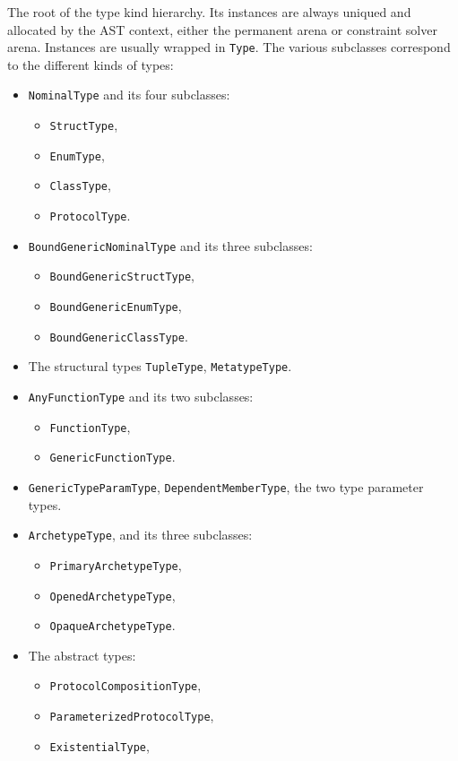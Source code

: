 \documentclass[../generics]{subfiles}
\begin{document}
The root of the type kind hierarchy. Its instances are always uniqued and allocated by the AST context, either the permanent arena or constraint solver arena. Instances are usually wrapped in \texttt{Type}. The various subclasses correspond to the different kinds of types:
\begin{itemize}
\item \texttt{NominalType} and its four subclasses:
\begin{itemize}
\item \texttt{StructType},
\item \texttt{EnumType},
\item \texttt{ClassType},
\item \texttt{ProtocolType}.
\end{itemize}
\item \texttt{BoundGenericNominalType} and its three subclasses:
\begin{itemize}
\item \texttt{BoundGenericStructType},
\item \texttt{BoundGenericEnumType},
\item \texttt{BoundGenericClassType}.
\end{itemize}
\item The structural types \texttt{TupleType}, \texttt{MetatypeType}.
\item \texttt{AnyFunctionType} and its two subclasses:
\begin{itemize}
\item \texttt{FunctionType},
\item \texttt{GenericFunctionType}.
\end{itemize}
\item \texttt{GenericTypeParamType}, \texttt{DependentMemberType}, the two type parameter types.
\item \texttt{ArchetypeType}, and its three subclasses:
\begin{itemize}
\item \texttt{PrimaryArchetypeType},
\item \texttt{OpenedArchetypeType},
\item \texttt{OpaqueArchetypeType}.
\end{itemize}
\item The abstract types:
\begin{itemize}
\item \texttt{ProtocolCompositionType},
\item \texttt{ParameterizedProtocolType},
\item \texttt{ExistentialType},

\end{itemize}
\end{itemize}
\end{document}
